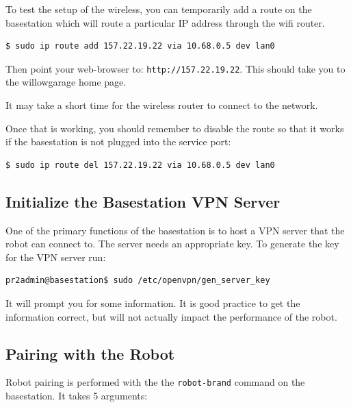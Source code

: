 To test the setup of the wireless, you can temporarily add a route on
the basestation which will route a particular IP address through the
wifi router.
\begin{verbatim}
$ sudo ip route add 157.22.19.22 via 10.68.0.5 dev lan0
\end{verbatim}
Then point your web-browser to: \texttt{http://157.22.19.22}. This
should take you to the willowgarage home page.  

It may take a short time for the wireless router to connect to the
network. 

Once that is working, you should remember to disable the route so that
it works if the basestation is not plugged into the service port:
\begin{verbatim}
$ sudo ip route del 157.22.19.22 via 10.68.0.5 dev lan0
\end{verbatim}

\subsection{Initialize the Basestation VPN Server}
One of the primary functions of the basestation is to host a VPN
server that the robot can connect to.  The server needs an appropriate
key.  To generate the key for the VPN server run:

\begin{verbatim}
pr2admin@basestation$ sudo /etc/openvpn/gen_server_key
\end{verbatim}

It will prompt you for some information.  It is good practice to get
the information correct, but will not actually impact the performance
of the robot.

\subsection{Pairing with the Robot}

Robot pairing is performed with the the \texttt{robot-brand} command
on the basestation.  It takes 5 arguments:

